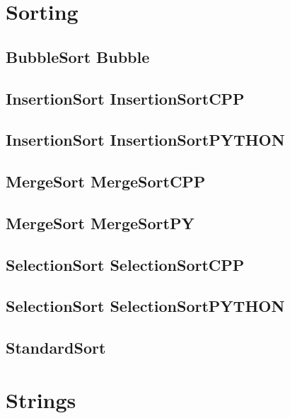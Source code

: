 \section{Sorting}
\subsection{BubbleSort Bubble}
\raggedbottom
\hrulefill
\subsection{InsertionSort InsertionSortCPP}
\raggedbottom
\hrulefill
\subsection{InsertionSort InsertionSortPYTHON}
\raggedbottom
\hrulefill
\subsection{MergeSort MergeSortCPP}
\raggedbottom
\hrulefill
\subsection{MergeSort MergeSortPY}
\raggedbottom
\hrulefill
\subsection{SelectionSort SelectionSortCPP}
\raggedbottom
\hrulefill
\subsection{SelectionSort SelectionSortPYTHON}
\raggedbottom
\hrulefill
\subsection{ StandardSort}
\raggedbottom
\hrulefill

\section{Strings}
